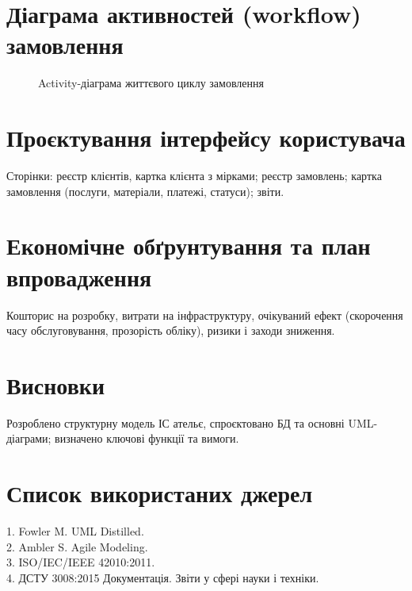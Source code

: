 \documentclass[14pt,a4paper]{extarticle}
\begin{document}
\section{Діаграма активностей (workflow) замовлення}
\begin{figure}[H]
  \centering
  \caption{Activity-діаграма життєвого циклу замовлення}
\end{figure}

\section{Проєктування інтерфейсу користувача}
Сторінки: реєстр клієнтів, картка клієнта з мірками; реєстр замовлень; картка замовлення (послуги, матеріали, платежі, статуси); звіти.

\section{Економічне обґрунтування та план впровадження}
Кошторис на розробку, витрати на інфраструктуру, очікуваний ефект (скорочення часу обслуговування, прозорість обліку), ризики і заходи зниження.

\section{Висновки}
Розроблено структурну модель ІС ательє, спроєктовано БД та основні UML-діаграми; визначено ключові функції та вимоги.

\section*{Список використаних джерел}
1. Fowler M. UML Distilled.\\
2. Ambler S. Agile Modeling.\\
3. ISO/IEC/IEEE 42010:2011.\\
4. ДСТУ 3008:2015 Документація. Звіти у сфері науки і техніки.
\end{document}

